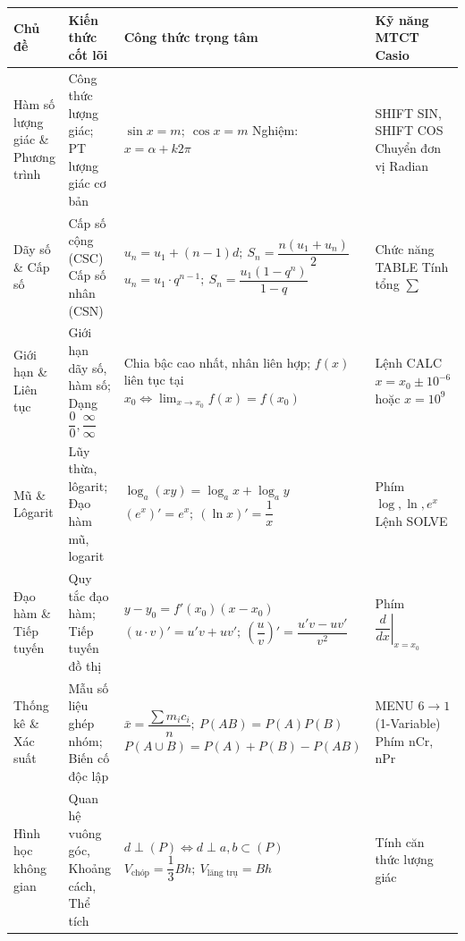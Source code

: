\documentclass[12pt, a4paper]{article}
\begin{document}
\begin{center}
\begin{tabularx}{\textwidth}{|>{\centering\arraybackslash}p{2.8cm}|>{\centering\arraybackslash}p{4cm}|>{\centering\arraybackslash}X|>{\centering\arraybackslash}X|}
\hline
\textbf{Chủ đề} & \textbf{Kiến thức cốt lõi} & \textbf{Công thức trọng tâm} & \textbf{Kỹ năng MTCT Casio} \\
\hline
Hàm số lượng giác \& Phương trình & Công thức lượng giác; PT lượng giác cơ bản & $\sin x = m; \ \cos x = m$ \newline Nghiệm: $x = \alpha + k2\pi$ & SHIFT SIN, SHIFT COS \newline Chuyển đơn vị Radian \\
\hline
Dãy số \& Cấp số & Cấp số cộng (CSC) \newline Cấp số nhân (CSN) & $u_n = u_1 + (n-1)d; \ S_n = \dfrac{n(u_1+u_n)}{2}$ \newline $u_n = u_1 \cdot q^{n-1}; \ S_n = \dfrac{u_1(1-q^n)}{1-q}$ & Chức năng TABLE \newline Tính tổng $\sum$ \\
\hline
Giới hạn \& Liên tục & Giới hạn dãy số, hàm số; Dạng $\dfrac{0}{0}, \dfrac{\infty}{\infty}$ & Chia bậc cao nhất, nhân liên hợp; $f(x)$ liên tục tại $x_0 \iff \lim_{x \to x_0} f(x) = f(x_0)$ & Lệnh CALC $x = x_0 \pm 10^{-6}$ hoặc $x = 10^9$ \\
\hline
Mũ \& Lôgarit & Lũy thừa, lôgarit; Đạo hàm mũ, logarit & $\log_a(xy) = \log_a x + \log_a y$ \newline $(e^x)' = e^x; \ (\ln x)' = \dfrac{1}{x}$ & Phím $\log, \ln, e^x$ \newline Lệnh SOLVE \\
\hline
Đạo hàm \& Tiếp tuyến & Quy tắc đạo hàm; Tiếp tuyến đồ thị & $y - y_0 = f'(x_0)(x - x_0)$ \newline $(u \cdot v)' = u'v + uv'; \ \left(\dfrac{u}{v}\right)' = \dfrac{u'v - uv'}{v^2}$ & Phím $\left.\dfrac{d}{dx}\right|_{x=x_0}$ \\
\hline
Thống kê \& Xác suất & Mẫu số liệu ghép nhóm; Biến cố độc lập & $\bar{x} = \dfrac{\sum m_i c_i}{n}; \ P(AB) = P(A)P(B)$ \newline $P(A \cup B) = P(A) + P(B) - P(AB)$ & MENU $6 \to 1$ (1-Variable) \newline Phím nCr, nPr \\
\hline
Hình học không gian & Quan hệ vuông góc, Khoảng cách, Thể tích & $d \perp (P) \iff d \perp a, b \subset (P)$ \newline $V_{\text{chóp}} = \dfrac{1}{3}Bh; \ V_{\text{lăng trụ}} = Bh$ & Tính căn thức lượng giác \\
\hline
\end{tabularx}
\end{center}
\end{document}
